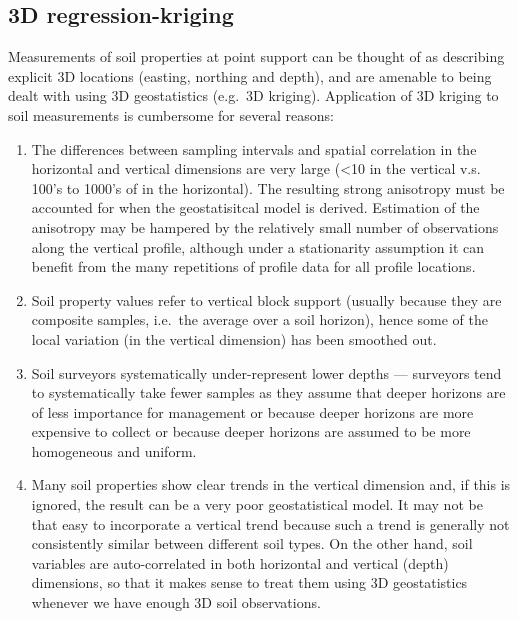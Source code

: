 \documentclass[11pt]{krantz}
\theoremstyle{definition}
\theoremstyle{definition}
\theoremstyle{definition}
\theoremstyle{remark}
\begin{document}
\hypertarget{regression-kriging-3D}{%
\subsection{3D regression-kriging}\label{regression-kriging-3D}}

Measurements of soil properties at point support can be thought of as
describing explicit 3D locations (easting, northing and depth), and are
amenable to being dealt with using 3D geostatistics (e.g.~3D kriging).
Application of 3D kriging to soil measurements is cumbersome for several
reasons:

\begin{enumerate}
\def\labelenumi{\arabic{enumi}.}
\item
  The differences between sampling intervals and spatial correlation in
  the horizontal and vertical dimensions are very large (\textless{}10
  in the vertical v.s. 100's to 1000's of in the horizontal). The
  resulting strong anisotropy must be accounted for when the
  geostatisitcal model is derived. Estimation of the anisotropy may be
  hampered by the relatively small number of observations along the
  vertical profile, although under a stationarity assumption it can
  benefit from the many repetitions of profile data for all profile
  locations.
\item
  Soil property values refer to vertical block support (usually because
  they are composite samples, i.e.~the average over a soil horizon),
  hence some of the local variation (in the vertical dimension) has been
  smoothed out.
\item
  Soil surveyors systematically under-represent lower depths ---
  surveyors tend to systematically take fewer samples as they assume
  that deeper horizons are of less importance for management or because
  deeper horizons are more expensive to collect or because deeper
  horizons are assumed to be more homogeneous and uniform.
\item
  Many soil properties show clear trends in the vertical dimension and,
  if this is ignored, the result can be a very poor geostatistical
  model. It may not be that easy to incorporate a vertical trend because
  such a trend is generally not consistently similar between different
  soil types. On the other hand, soil variables are auto-correlated in
  both horizontal and vertical (depth) dimensions, so that it makes
  sense to treat them using 3D geostatistics whenever we have enough 3D
  soil observations.
\end{enumerate}
\end{document}
